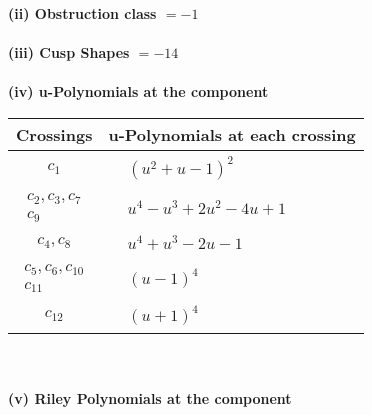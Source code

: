 \documentclass[1p]{elsarticle_modified}
\theoremstyle{definition}
\begin{document}
\flushleft \textbf{(ii) Obstruction class $= -1$}\\~\\
\flushleft \textbf{(iii) Cusp Shapes $= -14$}\\~\\
\newpage\renewcommand{\arraystretch}{1}
\flushleft \textbf{(iv) u-Polynomials at the component}\newline \\
\begin{tabular}{m{50pt}|m{274pt}}
Crossings & \hspace{64pt}u-Polynomials at each crossing \\
\hline $$\begin{aligned}c_{1}\end{aligned}$$&$\begin{aligned}
&(u^2+u-1)^2
\end{aligned}$\\
\hline $$\begin{aligned}c_{2},c_{3},c_{7}\\c_{9}\end{aligned}$$&$\begin{aligned}
&u^4- u^3+2 u^2-4 u+1
\end{aligned}$\\
\hline $$\begin{aligned}c_{4},c_{8}\end{aligned}$$&$\begin{aligned}
&u^4+u^3-2 u-1
\end{aligned}$\\
\hline $$\begin{aligned}c_{5},c_{6},c_{10}\\c_{11}\end{aligned}$$&$\begin{aligned}
&(u-1)^4
\end{aligned}$\\
\hline $$\begin{aligned}c_{12}\end{aligned}$$&$\begin{aligned}
&(u+1)^4
\end{aligned}$\\
\hline
\end{tabular}\\~\\
\newpage\renewcommand{\arraystretch}{1}
\flushleft \textbf{(v) Riley Polynomials at the component}\newline \\
\end{document}
